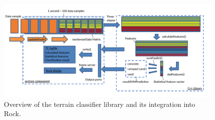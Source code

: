 \begin{figure}[!h] 
	\centering 
	\begin{minipage}[t]{\linewidth} 
		\centering 
		\includegraphics[width=\textwidth]{../figures/OverviewTC2.pdf}
		\caption{\label{fig:overview}Overview of the terrain classifier library and its integration into Rock.}
		\vspace{0.5cm}
	\end{minipage} 
    

\end{figure}

